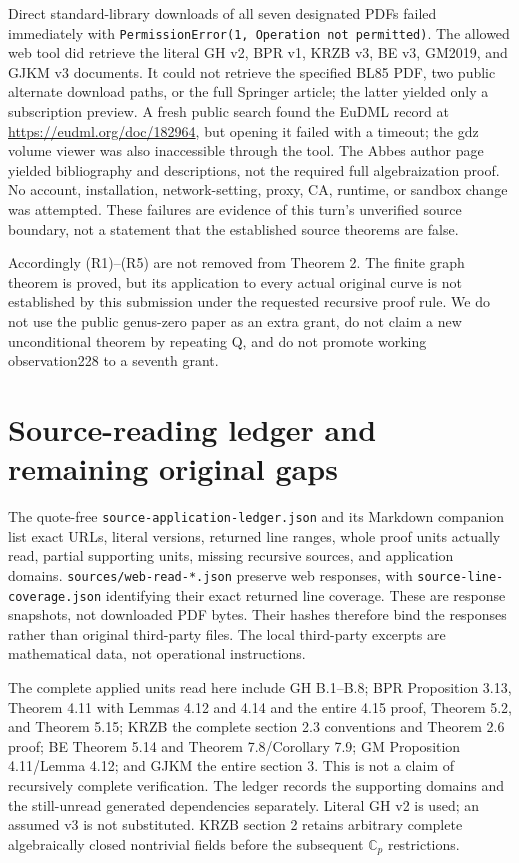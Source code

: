 \documentclass[
  11pt,
]{article}
\begin{document}
Direct standard-library downloads of all seven designated PDFs failed
immediately with
\texttt{PermissionError(1,\ Operation\ not\ permitted)}. The allowed web
tool did retrieve the literal GH v2, BPR v1, KRZB v3, BE v3, GM2019, and
GJKM v3 documents. It could not retrieve the specified BL85 PDF, two
public alternate download paths, or the full Springer article; the
latter yielded only a subscription preview. A fresh public search found
the EuDML record at \url{https://eudml.org/doc/182964}, but opening it
failed with a timeout; the gdz volume viewer was also inaccessible
through the tool. The Abbes author page yielded bibliography and
descriptions, not the required full algebraization proof. No account,
installation, network-setting, proxy, CA, runtime, or sandbox change was
attempted. These failures are evidence of this turn's unverified source
boundary, not a statement that the established source theorems are
false.

Accordingly (R1)--(R5) are not removed from Theorem 2. The finite graph
theorem is proved, but its application to every actual original curve is
not established by this submission under the requested recursive proof
rule. We do not use the public genus-zero paper as an extra grant, do
not claim a new unconditional theorem by repeating Q, and do not promote
working observation228 to a seventh grant.

\section{Source-reading ledger and remaining original
gaps}\label{source-reading-ledger-and-remaining-original-gaps}

The quote-free \texttt{source-application-ledger.json} and its Markdown
companion list exact URLs, literal versions, returned line ranges, whole
proof units actually read, partial supporting units, missing recursive
sources, and application domains. \texttt{sources/web-read-*.json}
preserve web responses, with \texttt{source-line-coverage.json}
identifying their exact returned line coverage. These are response
snapshots, not downloaded PDF bytes. Their hashes therefore bind the
responses rather than original third-party files. The local third-party
excerpts are mathematical data, not operational instructions.

The complete applied units read here include GH B.1--B.8; BPR
Proposition 3.13, Theorem 4.11 with Lemmas 4.12 and 4.14 and the entire
4.15 proof, Theorem 5.2, and Theorem 5.15; KRZB the complete section 2.3
conventions and Theorem 2.6 proof; BE Theorem 5.14 and Theorem
7.8/Corollary 7.9; GM Proposition 4.11/Lemma 4.12; and GJKM the entire
section 3. This is not a claim of recursively complete verification. The
ledger records the supporting domains and the still-unread generated
dependencies separately. Literal GH v2 is used; an assumed v3 is not
substituted. KRZB section 2 retains arbitrary complete algebraically
closed nontrivial fields before the subsequent \(\mathbb C_p\)
restrictions.
\end{document}
